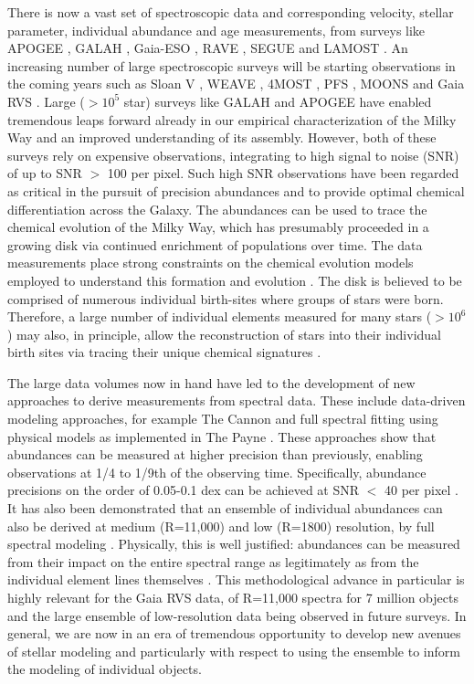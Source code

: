\documentclass[a4paper,fleqn,usenatbib]{mnras}
\begin{document}
There is now a vast set of spectroscopic data and corresponding velocity, stellar parameter, individual abundance and age measurements, from surveys like APOGEE \citep{Majewski2017}, GALAH \citep{deSilva2015}, Gaia-ESO \citep{Gilmore2012}, RAVE \citep{Steinmetz2006}, SEGUE \citep{Yanny2009} and LAMOST \citep{Newberg2012}. An increasing number of large spectroscopic surveys will be starting observations in the coming years such as Sloan V \citep{Kollmeier2017}, WEAVE \citep{Bonifacio2016}, 4MOST \citep{deJong2016}, PFS \citep{PFS2016}, MOONS \citep{C2014} and Gaia RVS \citep{Gaia2016}. Large ($> 10^5$ star) surveys like GALAH and APOGEE have enabled tremendous leaps forward already in our empirical characterization of the Milky Way and an improved understanding of its assembly. However, both of these surveys rely on expensive observations, integrating to high signal to noise (SNR) of up to SNR $>$ 100 per pixel. Such high SNR observations have been regarded as critical in the pursuit of precision abundances and to provide optimal chemical differentiation across the Galaxy. The abundances can be used to trace the chemical evolution of the Milky Way, which has presumably proceeded in a growing disk via continued enrichment of populations over time. The data measurements place strong constraints on the chemical evolution models employed to understand this formation and evolution \citep[e.g.][]{Clarke2019, Minchev2013, Minchev2014}. The disk is believed to be comprised of numerous individual birth-sites where groups of stars were born. Therefore, a large number of individual elements measured for many stars ($> 10^6$) may also, in principle,  allow the reconstruction of stars into their individual birth sites via tracing their unique chemical signatures \citep[e.g.][]{BH2010}. 

The large data volumes now in hand have led to the development of new approaches to derive measurements from spectral data. These include data-driven modeling approaches, for example The Cannon \citep{Ness2015} and full spectral fitting using physical models as implemented in The Payne \citep{Ting2018}. These approaches show that abundances can be measured at higher precision than previously, enabling observations at 1/4 to 1/9th of the observing time. Specifically, abundance precisions on the order of 0.05-0.1 dex can be achieved at SNR $<$ 40 per pixel \citep{Ness2018, Ting2018, Ho2017b}. It has also been demonstrated that an ensemble of individual abundances can also be derived at medium (R=11,000) and low (R=1800) resolution, by full spectral modeling \citep[e.g.][and Wheeler et al., in prep]{Casey2016, Ting2017}. Physically, this is well justified: abundances can be measured from their impact on the entire spectral range as legitimately as from the individual element lines themselves  \citep[e.g.][]{Ting2018}. This methodological advance in particular is highly relevant for the Gaia RVS data, of R=11,000 spectra for 7 million objects and the large ensemble of low-resolution data being observed in future surveys. In general, we are now in an era of tremendous opportunity to develop new avenues of stellar modeling and particularly with respect to using the ensemble to inform the modeling of individual objects. 
\end{document}
